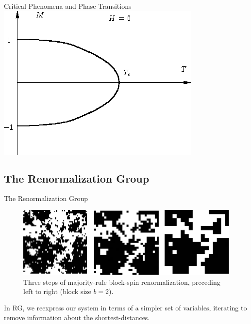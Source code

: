 \documentclass{beamer}
\begin{document}
\begin{frame}{Critical Phenomena and Phase Transitions}
  \includegraphics[width=.75\textwidth]{figures/correlation-length.png}
  \caption{The Ising model has a \textit{phase transition} between an ordered
    phase and a disordered phase.}
\end{frame}

\subsection{The Renormalization Group}
\begin{frame}{The Renormalization Group}
  \begin{figure}[ht]
    \centering
    \includegraphics[width=.8\textwidth]{figures/block-rg.png}
    \caption{Three steps of majority-rule block-spin renormalization,
      preceding left to right (block size $b=2$).\label{fig:block-rg}}
  \end{figure}%

  {\large In RG, we reexpress our system in terms of a simpler set of
    variables, iterating to remove information about the
    shortest-distances.}

\end{frame}

\end{document}
